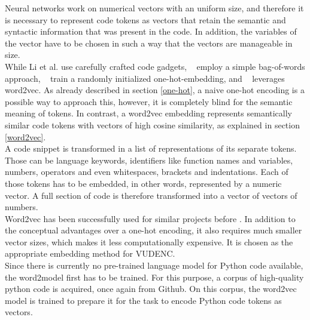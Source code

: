 \documentclass[
a4paper,
pagesize,
pdftex,
12pt,
twoside, %
BCOR=5mm, %
ngerman,
fleqn,
final,
]{scrartcl}
\begin{document}
	Neural networks work on numerical vectors with an uniform size, and therefore it is necessary to represent code tokens as vectors that retain the semantic and syntactic information that was present in the code. In addition, the variables of the vector have to be chosen in such a way that the vectors are manageable in size.\\
	While Li et al.\cite{Li.2018} use carefully crafted code gadgets, ~\cite{Hovsepyan.2012} employ a simple bag-of-words approach, ~\cite{Russell.2018} train a randomly initialized one-hot-embedding, and ~\cite{Liu.2018} leverages word2vec. As already described in section \ref{one-hot}, a naive one-hot encoding is a possible way to approach this, however, it is completely blind for the semantic meaning of tokens. In contrast, a word2vec embedding represents semantically similar code tokens with vectors of high cosine similarity, as explained in section \ref{word2vec}.\\
	A code snippet is transformed in a list of representations of its separate tokens. Those can be language keywords, identifiers like function names and variables, numbers, operators and even whitespaces, brackets and indentations. Each of those tokens has to be embedded, in other words, represented by a numeric vector. A full section of code is therefore transformed into a vector of vectors of numbers.\\
	Word2vec has been successfully used for similar projects before \cite{Liu.2018}. In addition to the conceptual advantages over a one-hot encoding, it also requires much smaller vector sizes, which makes it less computationally expensive. It is chosen as the appropriate embedding method for VUDENC.\\
	Since there is currently no pre-trained language model for Python code available, the word2model first has to be trained. For this purpose, a corpus of high-quality python code is acquired, once again from Github. On this corpus, the word2vec model is trained to prepare it for the task to encode Python code tokens as vectors.
	
\end{document}
